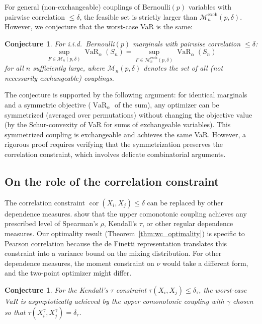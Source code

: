 \documentclass[11pt]{article}
\newtheorem{conjecture}[theorem]{Conjecture}
\theoremstyle{definition}
\newcommand{\VaR}{\operatorname{VaR}}
\newcommand{\1}{\mathbf{1}}
\newcommand{\calM}{\mathcal{M}}
\begin{document}
For general (non-exchangeable) couplings of Bernoulli$(p)$ variables with pairwise correlation $\leq \delta$, the feasible set is strictly larger than $\calM_n^{\mathrm{exch}}(p, \delta)$. However, we conjecture that the worst-case VaR is the same:

\begin{conjecture}\label{conj:non_exch}
For i.i.d.\ Bernoulli$(p)$ marginals with pairwise correlation $\leq \delta$:
\[
  \sup_{F \in \calM_n(p,\delta)} \VaR_\alpha(S_n) = \sup_{F \in \calM_n^{\mathrm{exch}}(p,\delta)} \VaR_\alpha(S_n)
\]
for all $n$ sufficiently large, where $\calM_n(p,\delta)$ denotes the set of \emph{all} (not necessarily exchangeable) couplings.
\end{conjecture}

The conjecture is supported by the following argument: for identical marginals and a symmetric objective ($\VaR_\alpha$ of the sum), any optimizer can be symmetrized (averaged over permutations) without changing the objective value (by the Schur-convexity of VaR for sums of exchangeable variables). This symmetrized coupling is exchangeable and achieves the same VaR. However, a rigorous proof requires verifying that the symmetrization preserves the correlation constraint, which involves delicate combinatorial arguments.

\subsection{On the role of the correlation constraint}

The correlation constraint $\operatorname{cor}(X_i, X_j) \leq \delta$ can be replaced by other dependence measures. \citet{DVNSupper} show that the upper comonotonic coupling achieves any prescribed level of Spearman's $\rho$, Kendall's $\tau$, or other regular dependence measures. Our optimality result (Theorem~\ref{thm:wc_optimality}) is specific to Pearson correlation because the de Finetti representation translates this constraint into a variance bound on the mixing distribution. For other dependence measures, the moment constraint on $\nu$ would take a different form, and the two-point optimizer might differ.

\begin{conjecture}\label{conj:kendall}
For the Kendall's $\tau$ constraint $\tau(X_i, X_j) \leq \delta_\tau$, the worst-case VaR is asymptotically achieved by the upper comonotonic coupling with $\gamma$ chosen so that $\tau(X_i^\gamma, X_j^\gamma) = \delta_\tau$.
\end{conjecture}
\end{document}
